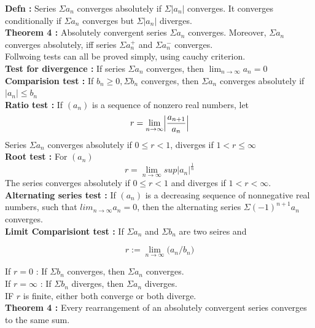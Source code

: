 \documentclass{report}
\begin{document}
\noindent \textbf{Defn :} Series $\Sigma a_n$ converges absolutely if $\Sigma |a_n|$ converges. It converges conditionally if $\Sigma a_n$ converges but $\Sigma |a_n|$ diverges.\\

\noindent \textbf{Theorem 4 :} Absolutely convergent series $\Sigma a_n$ converges. Moreover, $\Sigma a_n$ converges absolutely, iff series $\Sigma a_n^{+}$ and $\Sigma a_n^{-}$ converges.\\

Follwoing tests can all be proved simply, using cauchy criterion.\\

\noindent \textbf{Test for divergence :}  If series $\Sigma a_n$ converges, then $\lim_{n\to\infty} a_n = 0$ \\

\noindent \textbf{Comparision test :} If $b_n\ge0, \Sigma b_n$ converges, then $\Sigma a_n$ converges absolutely if $|a_n| \le b_n$\\

\noindent \textbf{Ratio test :} If $(a_n)$ is a sequence of nonzero real numbers, let 
$$ r = \lim_{n\to\infty}\Bigl|\frac{a_{n+1}}{a_n}\Bigr|$$
\noindent Series $\Sigma a_n$ converges absolutely if $0\le r<1$, diverges if $1<r\le \infty$\\

\noindent \textbf{Root test :} For $(a_n)$
$$ r = \lim_{n\to\infty} sup|a_n|^{\frac{1}{n}}$$
\noindent The series converges absolutely if $0\le r<1$ and diverges if $1<r<\infty$.\\

\noindent\textbf{Alternating series test :} If $(a_n)$ is a decreasing sequence of nonnegative real numbers, such that $lim_{n\to\infty}a_n=0$, then the alternating series $\Sigma (-1)^{n+1}a_n$ converges.\\

\noindent\textbf{Limit Comparisiont test :} If $\Sigma a_n$ and $\Sigma b_n$ are two seires and 

$$ r:= \lim_{n\to\infty}\big(a_n/b_n\big) $$

\noindent If $r=0$ : If $\Sigma b_n$ converges, then $\Sigma a_n$ converges.\\
\noindent If $r=\infty$ : If $\Sigma b_n$ diverges, then $\Sigma a_n$ diverges.\\
\noindent IF $r$ is finite, either both converge or both diverge.\\

\noindent\textbf{Theorem 4 :} Every rearrangement of an absolutely convergent series converges to the same sum.\\
\end{document}

